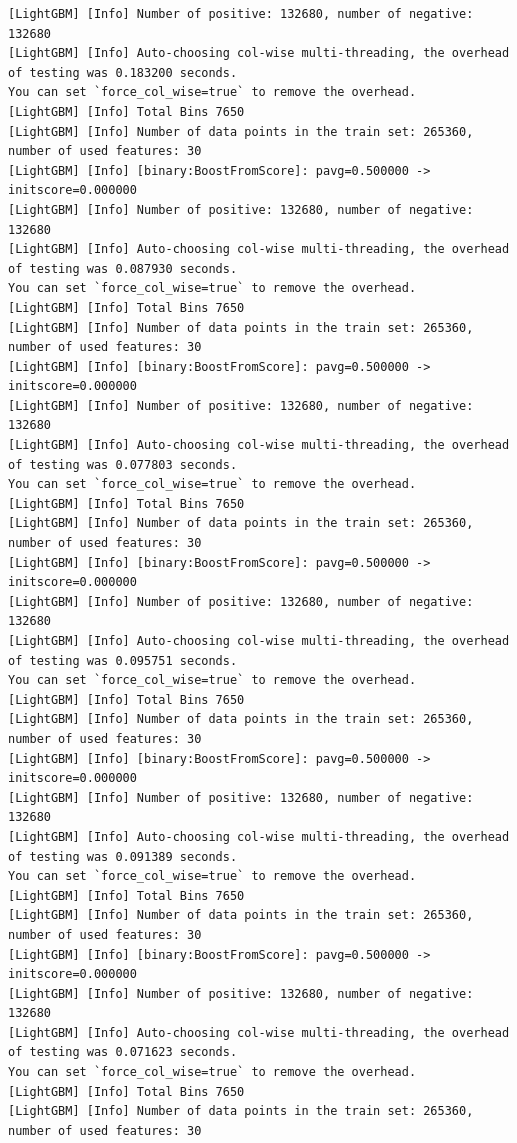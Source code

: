 \documentclass[
  letterpaper,
  DIV=11,
  numbers=noendperiod]{scrartcl}
\begin{document}
\begin{verbatim}
[LightGBM] [Info] Number of positive: 132680, number of negative: 132680
[LightGBM] [Info] Auto-choosing col-wise multi-threading, the overhead of testing was 0.183200 seconds.
You can set `force_col_wise=true` to remove the overhead.
[LightGBM] [Info] Total Bins 7650
[LightGBM] [Info] Number of data points in the train set: 265360, number of used features: 30
[LightGBM] [Info] [binary:BoostFromScore]: pavg=0.500000 -> initscore=0.000000
[LightGBM] [Info] Number of positive: 132680, number of negative: 132680
[LightGBM] [Info] Auto-choosing col-wise multi-threading, the overhead of testing was 0.087930 seconds.
You can set `force_col_wise=true` to remove the overhead.
[LightGBM] [Info] Total Bins 7650
[LightGBM] [Info] Number of data points in the train set: 265360, number of used features: 30
[LightGBM] [Info] [binary:BoostFromScore]: pavg=0.500000 -> initscore=0.000000
[LightGBM] [Info] Number of positive: 132680, number of negative: 132680
[LightGBM] [Info] Auto-choosing col-wise multi-threading, the overhead of testing was 0.077803 seconds.
You can set `force_col_wise=true` to remove the overhead.
[LightGBM] [Info] Total Bins 7650
[LightGBM] [Info] Number of data points in the train set: 265360, number of used features: 30
[LightGBM] [Info] [binary:BoostFromScore]: pavg=0.500000 -> initscore=0.000000
[LightGBM] [Info] Number of positive: 132680, number of negative: 132680
[LightGBM] [Info] Auto-choosing col-wise multi-threading, the overhead of testing was 0.095751 seconds.
You can set `force_col_wise=true` to remove the overhead.
[LightGBM] [Info] Total Bins 7650
[LightGBM] [Info] Number of data points in the train set: 265360, number of used features: 30
[LightGBM] [Info] [binary:BoostFromScore]: pavg=0.500000 -> initscore=0.000000
[LightGBM] [Info] Number of positive: 132680, number of negative: 132680
[LightGBM] [Info] Auto-choosing col-wise multi-threading, the overhead of testing was 0.091389 seconds.
You can set `force_col_wise=true` to remove the overhead.
[LightGBM] [Info] Total Bins 7650
[LightGBM] [Info] Number of data points in the train set: 265360, number of used features: 30
[LightGBM] [Info] [binary:BoostFromScore]: pavg=0.500000 -> initscore=0.000000
[LightGBM] [Info] Number of positive: 132680, number of negative: 132680
[LightGBM] [Info] Auto-choosing col-wise multi-threading, the overhead of testing was 0.071623 seconds.
You can set `force_col_wise=true` to remove the overhead.
[LightGBM] [Info] Total Bins 7650
[LightGBM] [Info] Number of data points in the train set: 265360, number of used features: 30

\end{verbatim}
\end{document}
